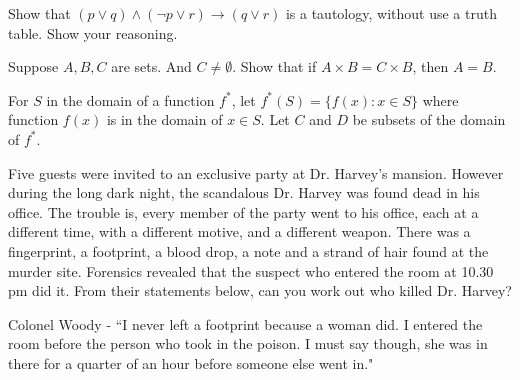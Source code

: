\documentclass[addpoints]{exam}
\begin{document}
\begin{questions}
\begin{parts}
\end{parts}

\question[10] Show that $(p\vee q) \wedge (\neg p \vee r)\rightarrow (q \vee r)$ is a tautology, without use a truth table. Show your reasoning.

  \begin{solution}
  \end{solution}

\question[20] Suppose $A, B, C$ are sets. And $C \neq \emptyset$. Show that if $A \times B = C \times B$, then $A = B$.

  \begin{solution}
  \end{solution}
\question For $S$ in the domain of a function $f^*$, let $f^*(S) = \{ f(x) : x\in S \}$ where function $f(x)$ is in the domain of $x\in S$. Let $C$ and $D$ be subsets of the domain of $f^*$.

\question
    Five guests were invited to an exclusive party at Dr. Harvey's mansion. However during the long dark night, the scandalous Dr. Harvey was found dead in his office. The trouble is, every member of the party went to his office, each at a different time, with a different motive, and a different weapon. There was a fingerprint, a footprint, a blood drop, a note and a strand of hair found at the murder site. Forensics revealed that the suspect who entered the room at 10.30 pm did it. From their statements below, can you work out who killed Dr. Harvey? 

Colonel Woody - ``I never left a footprint because a woman did. I entered the room before the person who took in the poison. I must say though, she was in there for a quarter of an hour before someone else went in."


\end{questions}
\end{document}
